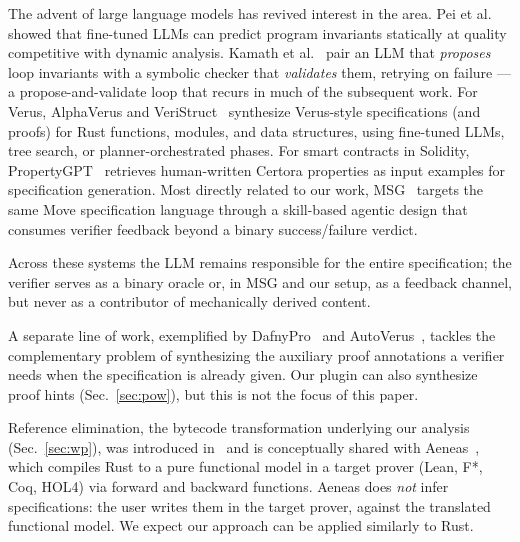 The advent of large language models has revived interest in the area.
Pei et al.~\cite{PeiEtAl23} showed that fine-tuned LLMs can predict program invariants statically at quality competitive with dynamic analysis.
Kamath et al.~\cite{KamathEtAl23} pair an LLM that \emph{proposes} loop invariants with a symbolic checker that \emph{validates} them, retrying on failure --- a propose-and-validate loop that recurs in much of the subsequent work.
For Verus, AlphaVerus and VeriStruct~\cite{VeriStruct26} synthesize Verus-style specifications (and proofs) for Rust functions, modules, and data structures, using fine-tuned LLMs, tree search, or planner-orchestrated phases.
For smart contracts in Solidity, PropertyGPT~\cite{PropertyGPT25} retrieves human-written Certora properties as input examples for specification generation.
Most directly related to our work, MSG~\cite{MSG25} targets the same Move specification language through a skill-based agentic design that consumes verifier feedback beyond a binary success/failure verdict.

Across these systems the LLM remains responsible for the entire specification; the verifier serves as a binary oracle or, in MSG and our setup, as a feedback channel, but never as a contributor of mechanically derived content.

A separate line of work, exemplified by DafnyPro~\cite{DafnyPro26} and AutoVerus~\cite{AutoVerus25}, tackles the complementary problem of synthesizing the auxiliary proof annotations a verifier needs when the specification is already given. Our plugin can also synthesize proof hints (Sec.~\ref{sec:pow}), but this is not the focus of this paper.

Reference elimination, the bytecode transformation underlying our \WP analysis (Sec.~\ref{sec:wp}), was introduced in~\cite{DillGPQXZ22} and is conceptually shared with Aeneas~\cite{Aeneas}, which compiles Rust to a pure functional model in a target prover (Lean, F*, Coq, HOL4) via forward and backward functions.
Aeneas does \emph{not} infer specifications: the user writes them in the target prover, against the translated functional model. We expect our \WP approach can be applied similarly to Rust.

